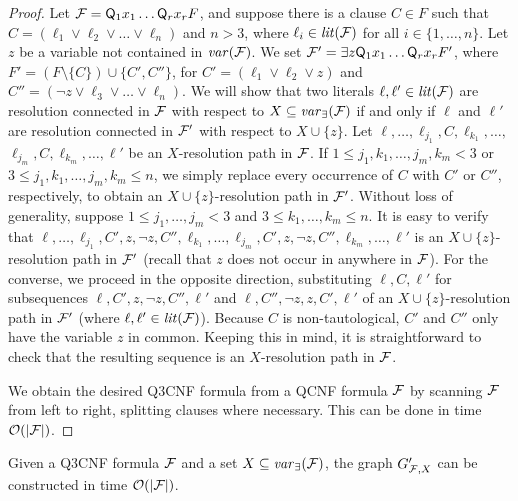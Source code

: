 \documentclass{llncs}
\newcommand{\longversion}[1]{#1}
\def\hy{\hbox{-}\nobreak\hskip0pt} \newcommand{\ellipsis}{$\dots$}
\newcommand{\Card}[1]{|#1|}
\begin{document}
\longversion{\begin{proof}
  Let $\mathcal{F} = \mathsf{Q}_1x_1\dots\mathsf{Q}_rx_r F$, and suppose there is a
  clause $C \in F$ such that $C = (\ell_1 \vee \ell_2 \vee \dots \vee \ell_n)$
  and $n > 3$, where $\ell_i \in \mathit{lit}(\mathcal{F})$ for all $i \in \{1, \dots, n
  \}$. Let $z$ be a variable not contained in $\mathit{var}(\mathcal{F})$. We set $\mathcal{F}' =
  \exists z \mathsf{Q}_1x_1\dots\mathsf{Q}_rx_r F'$, where $F' = (F \setminus
  \{ C \}) \cup \{C',C''\}$, for $C' = (\ell_1 \vee \ell_2 \vee z)$ and $C'' =
  (\neg z \vee \ell_3 \vee \dots \vee \ell_n)$. We will show that two literals
  $\ell, \ell' \in \mathit{lit}(\mathcal{F})$ are resolution connected in $\mathcal{F}$ with respect
  to $X \subseteq \mathit{var}_{\exists}(\mathcal{F})$ if and only if $\ell$ and $\ell'$ are
  resolution connected in $\mathcal{F}'$ with respect to $X \cup \{z\}$. Let $\ell, \dots,
  \ell_{j_1}, C, \ell_{k_1}, \dots,$\hskip 0pt$\ell_{j_m}, C,
  \ell_{k_m},\dots, \ell'$ be an $X$\hy resolution path in $\mathcal{F}$. If $1 \leq
  j_1,k_1,\dots,j_m,k_m < 3$ or $3 \leq j_1,k_1,\dots,j_m,k_m \leq n$, we
  simply replace every occurrence of $C$ with $C'$ or $C''$, respectively, to
  obtain an $X \cup \{z\}$\hy resolution path in $\mathcal{F}'$. Without loss of
  generality, suppose $1 \leq j_1,\dots,j_m < 3$ and $3 \leq k_1,\dots,k_m
  \leq n$. It is easy to verify that $\ell,\dots,\ell_{j_1},C',z,\neg
  z,$\hskip 0pt$C'',\ell_{k_1}, \dots,\ell_{j_m},C',z,\neg z,$\hskip
  0pt$C'',\ell_{k_m},\dots, \ell'$ is an $X \cup \{z\}$\hy resolution path in
  $\mathcal{F}'$ (recall that $z$ does not occur in anywhere in $\mathcal{F}$). For the
  converse, we proceed in the opposite direction, substituting $\ell,C,\ell'$
  for subsequences $\ell,C',z,\neg z, C'',\ell'$ and $\ell,C'',\neg z, z,
  C',\ell'$ of an $X\cup\{z\}$\hy resolution path in $\mathcal{F}'$ (where
  $\ell,\ell' \in \mathit{lit}(\mathcal{F})$). Because $C$ is non\hy tautological, $C'$ and
  $C''$ only have the variable $z$ in common. Keeping this in mind, it is
  straightforward to check that the resulting sequence is an $X$\hy resolution
  path in $\mathcal{F}$.

  We obtain the desired Q3CNF formula from a QCNF formula $\mathcal{F}$ by scanning
  $\mathcal{F}$ from left to right, splitting clauses where necessary. This can be
  done in time $\mathcal{O}(\Card{\FFF})$.
\end{proof}
 }
\begin{proposition}\label{prop:linearreduction}
  Given a Q3CNF formula $\mathcal{F}$ and a set $X \subseteq \mathit{var}_{\exists}(\mathcal{F})$,
  the graph $G'_{\mathcal{F},X}$ can be constructed in time
  $\mathcal{O}(\Card{\FFF})$.
\end{proposition}
\end{document}
